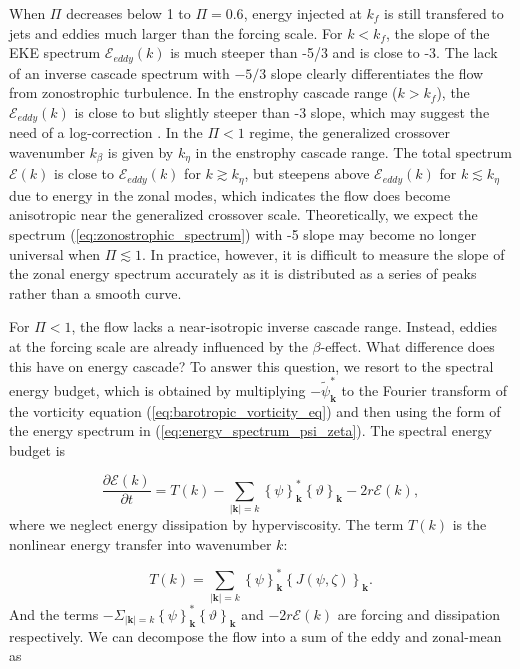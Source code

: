 \documentclass{ametsoc}
\begin{document}
When $\Pi$ decreases below 1 to $\Pi=0.6$, energy injected at $k_{f}$
is still transfered to jets and eddies much larger than the forcing
scale. For $k<k_{f}$, the slope of the EKE spectrum $\mathcal{E}_{eddy}(k)$
is much steeper than -5/3 and is close to -3. The lack of an inverse
cascade spectrum with $-5/3$ slope clearly differentiates the
flow from zonostrophic turbulence. In the enstrophy cascade range
($k>k_{f}$), the $\mathcal{E}_{eddy}(k)$ is close to but slightly
steeper than -3 slope, which may suggest the need of a log-correction
\citep{Kraichnan1971}. In the $\Pi<1$ regime, the generalized crossover
wavenumber $k_{\beta}$ is given by $k_{\eta}$ in the enstrophy cascade
range. The total spectrum $\mathcal{E}(k)$ is close to $\mathcal{E}_{eddy}(k)$
for $k\apprge k_{\eta}$, but steepens above $\mathcal{E}_{eddy}(k)$
for $k\apprle k_{\eta}$ due to energy in the zonal modes, which indicates
the flow does become anisotropic near the generalized crossover scale.
Theoretically, we expect the spectrum (\ref{eq:zonostrophic_spectrum})
with -5 slope may become no longer universal when $\Pi\apprle1$.
In practice, however, it is difficult to measure the slope of the
zonal energy spectrum accurately as it is distributed as a series of
peaks rather than a smooth curve.

For $\Pi<1$, the flow lacks a near-isotropic inverse cascade range.
Instead, eddies at the forcing scale are already influenced by the
$\beta$-effect. What difference does this have on energy cascade?
To answer this question, we resort to the spectral energy budget,
which is obtained by multiplying $-\widetilde{\psi}_{\mathbf{k}}^{*}$
to the Fourier transform of the vorticity equation (\ref{eq:barotropic_vorticity_eq})
and then using the form of the energy spectrum in (\ref{eq:energy_spectrum_psi_zeta}).
The spectral energy budget is

\begin{equation}
\frac{\partial\mathcal{E}(k)}{\partial t}=T(k)-\underset{|\mathbf{k}|=k}{\sum}\left\{ \psi\right\} _{\mathbf{k}}^{*}\left\{ \vartheta\right\} _{\mathbf{k}}-2r\mathcal{E}(k),
\end{equation}
where we neglect energy dissipation by hyperviscosity. The term $T(k)$
is the nonlinear energy transfer into wavenumber $k$:

\begin{equation}
T(k)=\underset{|\mathbf{k}|=k}{\sum}\left\{ \psi\right\} _{\mathbf{k}}^{*}\left\{ J(\psi,\zeta)\right\} _{\mathbf{k}}.
\end{equation}
And the terms $-\Sigma_{|\mathbf{k}|=k}\left\{ \psi\right\} _{\mathbf{k}}^{*}\left\{ \vartheta\right\} _{\mathbf{k}}$
and $-2r\mathcal{E}(k)$ are forcing and dissipation respectively.
We can decompose the flow into a sum of the eddy and zonal-mean as
\end{document}

